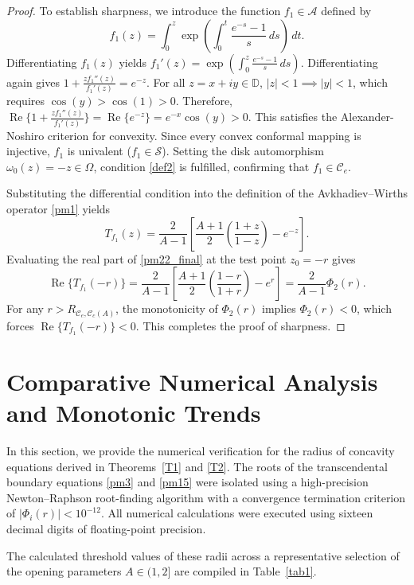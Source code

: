 \documentclass[12pt]{article}
\renewcommand{\Re}{\operatorname{Re}}
\begin{document}
\begin{proof}
To establish sharpness, we introduce the function $f_1 \in \mathcal{A}$ defined by
\begin{equation}\label{pm20}
f_1(z) = \int_0^z \exp\left( \int_0^t \frac{e^{-s}-1}{s}\,ds \right)\,dt.
\end{equation}
Differentiating $f_1(z)$ yields $f_1'(z) = \exp\left( \int_0^z \frac{e^{-s}-1}{s}\,ds \right)$. Differentiating again gives $1+\frac{zf_1''(z)}{f_1'(z)} = e^{-z}$. For all $z=x+iy \in \mathbb{D}$, $|z|<1 \implies |y|<1$, which requires $\cos(y) > \cos(1) > 0$. Therefore, $\Re\{1+\frac{zf_1''(z)}{f_1'(z)}\} = \Re\{e^{-z}\} = e^{-x}\cos(y) > 0$. This satisfies the Alexander-Noshiro criterion for convexity. Since every convex conformal mapping is injective, $f_1$ is univalent ($f_1 \in \mathcal{S}$). Setting the disk automorphism $\omega_0(z) = -z \in \Omega$, condition \eqref{def2} is fulfilled, confirming that $f_1 \in \mathcal{C}_e$.

Substituting the differential condition into the definition of the Avkhadiev--Wirths operator \eqref{pm1} yields
\begin{equation}\label{pm22_final}
T_{f_1}(z) = \frac{2}{A-1} \left[ \frac{A+1}{2} \left( \frac{1+z}{1-z} \right) - e^{-z} \right].
\end{equation}
Evaluating the real part of \eqref{pm22_final} at the test point $z_0 = -r$ gives
\[
\Re\{T_{f_1}(-r)\} = \frac{2}{A-1} \left[ \frac{A+1}{2} \left( \frac{1-r}{1+r} \right) - e^{r} \right] = \frac{2}{A-1}\Phi_2(r).
\]
For any $r > R_{\mathcal{C}_e,\mathcal{C}_c(A)}$, the monotonicity of $\Phi_2(r)$ implies $\Phi_2(r) < 0$, which forces $\Re\{T_{f_1}(-r)\} < 0$. This completes the proof of sharpness.
\end{proof}


\section{Comparative Numerical Analysis and Monotonic Trends}

In this section, we provide the numerical verification for the radius of concavity equations derived in Theorems~\ref{T1} and \ref{T2}. The roots of the transcendental boundary equations \eqref{pm3} and \eqref{pm15} were isolated using a high-precision Newton--Raphson root-finding algorithm with a convergence termination criterion of $|\Phi_i(r)| < 10^{-12}$. All numerical calculations were executed using sixteen decimal digits of floating-point precision.

The calculated threshold values of these radii across a representative selection of the opening parameters $A \in (1,2]$ are compiled in Table~\ref{tab1}.
\end{document}
